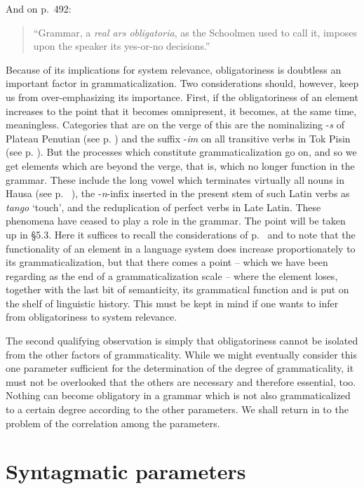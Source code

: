 \noindent And on p.~492:
\begin{quote}
“Grammar, a \textit{real ars obligatoria}, as the Schoolmen used to call it, imposes upon the speaker its yes-or-no decisions.”
\end{quote}

\noindent Because of its implications for system relevance, obligatoriness is doubtless an important factor in grammaticalization. Two considerations should, however, keep us from over-emphasizing its importance. First, if the obligatoriness of an element increases to the point that it becomes omnipresent, it becomes, at the same time, meaningless. Categories that are on the verge of this are the nominalizing -\textit{s} of Plateau Penutian (see p. \pageref{PlateauPenutian}) and the suffix -\textit{im} on all transitive verbs in Tok Pisin (see p. \pageref{ex:E11}). But the processes which constitute grammaticalization go on, and so we get elements which are beyond the verge, that is, which no longer function in the grammar. These include the long vowel which terminates virtually all nouns in Hausa (see p.~\pageref{page59}\chk%
), the -\textit{n}{}-infix inserted in the present stem of such Latin verbs as \textit{tango} ‘touch’, and the reduplication of perfect verbs in Late Latin. These phenomena have ceased to play a role in the grammar. The point will be taken up in §5.3. Here it suffices to recall the considerations of p.~\pageref{page141b}\chk%
 and to note that the functionality of an element in a language system does increase proportionately to its grammaticalization, but that there comes a point -- which we have been regarding as the end of a grammaticalization scale -- where the element loses, together with the last bit of semanticity, its grammatical function and is put on the shelf of linguistic history. This must be kept in mind if one wants to infer from obligatoriness to system relevance.

The second qualifying observation is simply that obligatoriness cannot be isolated from the other factors of grammaticality. While we might eventually consider this one parameter sufficient for the determination of the degree of grammaticality, it must not be overlooked that the others are necessary and therefore essential, too. Nothing can become obligatory in a grammar which is not also grammaticalized to a certain degree according to the other parameters. We shall return in  to the problem of the correlation among the parameters.

\section{Syntagmatic parameters} \label{sec:4.3}
